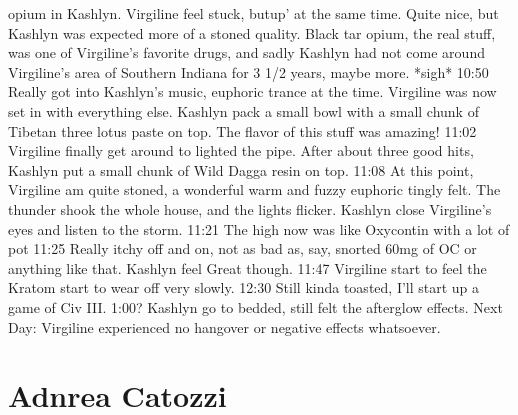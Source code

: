 \documentclass[12pt]{book}
\begin{document}
opium in Kashlyn. Virgiline feel stuck, butup' at the same time. Quite nice, but Kashlyn was expected more of a stoned quality. Black tar opium, the real stuff, was one of Virgiline's favorite drugs, and sadly Kashlyn had not come around Virgiline's area of Southern Indiana for 3 1/2 years, maybe more. *sigh* 10:50 Really got into Kashlyn's music, euphoric trance at the time. Virgiline was now set in with everything else. Kashlyn pack a small bowl with a small chunk of Tibetan three lotus paste on top. The flavor of this stuff was amazing! 11:02 Virgiline finally get around to lighted the pipe. After about three good hits, Kashlyn put a small chunk of Wild Dagga resin on top. 11:08 At this point, Virgiline am quite stoned, a wonderful warm and fuzzy euphoric tingly felt. The thunder shook the whole house, and the lights flicker. Kashlyn close Virgiline's eyes and listen to the storm. 11:21 The high now was like Oxycontin with a lot of pot 11:25 Really itchy off and on, not as bad as, say, snorted 60mg of OC or anything like that. Kashlyn feel Great though. 11:47 Virgiline start to feel the Kratom start to wear off very slowly. 12:30 Still kinda toasted, I'll start up a game of Civ III. 1:00? Kashlyn go to bedded, still felt the afterglow effects. Next Day: Virgiline experienced no hangover or negative effects whatsoever.






\chapter{Adnrea Catozzi}
\end{document}
